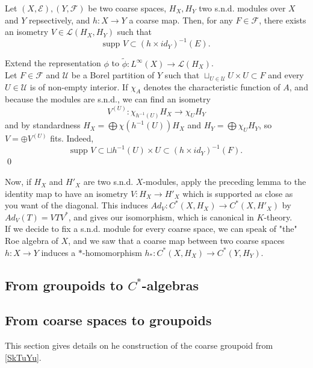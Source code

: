 \begin{prop}
Let $(X,\mathcal E),(Y,\mathcal F)$ be two coarse spaces, $H_X,H_Y$ two s.n.d. modules over $X$ and $Y$ repsectively, and $h :X\rightarrow Y$ a coarse map. Then, for any $F\in \mathcal F$, there exists an isometry $V\in \mathcal L(H_X,H_Y)$ such that
\[\text{supp }V \subset (h\times id_Y)^{-1}(E).\]
\end{prop}

\begin{dem}
Extend the representation $\phi$ to $\tilde \phi : L^\infty (X)\rightarrow \mathcal L(H_X)$. \\

Let $F\in \mathcal F$ and $\mathcal U$ be a Borel partition of $Y$ such that $\sqcup_{U\in \mathcal U} U\times U \subset F$ and every $U\in \mathcal U$ is of non-empty interior. If $\chi_A$ denotes the characteristic function of $A$, and because the modules are s.n.d., we can find an isometry \[V^{(U)} :\chi_{h^{-1}(U)}H_X \rightarrow \chi_U H_Y\] 
and by standardness $H_X =\bigoplus \chi(h^{-1}(U)) H_X$ and $H_Y =\bigoplus \chi_U H_Y$, so $V = \oplus V^{(U)}$ fits. Indeed, 
\[\text{supp }V\subset \sqcup h^{-1}(U)\times U \subset (h\times id_Y)^{-1}(F).\] 
\qed
\end{dem}

Now, if $H_X$ and $H'_X$ are two s.n.d. $X$-modules, apply the preceding lemma to the identity map to have an isometry $V: H_X\rightarrow H'_X$ which is supported as close as you want of the diagonal. This induces $Ad_V : C^*(X,H_X)\rightarrow C^*(X,H'_X)$ by $Ad_V(T) = VTV^*$, and gives our isomorphism, which is canonical in $K$-theory. \\

If we decide to fix a s.n.d. module for every coarse space, we can speak of "the" Roe algebra of $X$, and we saw that a coarse map between two coarse spaces $h : X\rightarrow Y$ induces a $*$-homomorphism $h_* : C^*(X,H_X)\rightarrow C^*(Y,H_Y)$. 

\subsection{From groupoids to $C^*$-algebras}

\subsection{From coarse spaces to groupoids}

This section gives details on he construction of the coarse groupoid from \ref{SkTuYu}.\\

